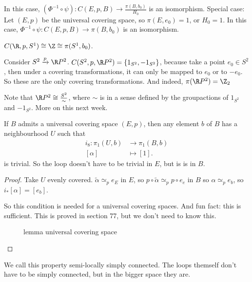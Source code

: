 In this case, $(\Phi^{-1}  \circ  \psi): C(E, p, B) \to  \frac{\pi(B,b_0) }{H_0}$ is an isomorphism.
Special case: Let $(E, p)$ be the universal covering space, so $\pi(E,e_0)  = 1$, or $H_0 = 1$.
In this case, $\Phi^{-1}  \circ  \psi: C(E, p, B) \to  \pi(B,b_0) $ is an isomorphism.

\begin{eg}
    $C(\R, p, S^1) \cong \Z \cong \pi(S^{1}, b_0)$.
\end{eg}
\begin{eg}
    Consider $S^2 \xrightarrow{p} \R P^2$.
    $C(S^2, p, \R P^2) = \{1_{S^2}, -1_{S^2}\}$,
    because take a point $e_0 \in S^2$, then under a covering transformations, it can only be mapped to $e_0$ or to $-e_0$.
    So these are the only covering transformations.
    And indeed, $\pi(\R P^2) = \Z_2$

    Note that $\R P^2 \cong \frac{S^2}{\sim}$, where $\sim $ is in a sense defined by the groupactions of $1_{S^2}$ and $-1_{S^2}$. More on this next week.
\end{eg}

\begin{lemma}[75.4]
    If $B$ admits a universal covering space $(E, p)$, then any element $b$ of $B$ has a neighbourhood $U$ such that
    \begin{align*}
        i_8: \pi_1(U, b) &\longrightarrow \pi_1(B, b) \\
        [\alpha] &\longmapsto [1]
    .\end{align*}
    is trivial. So the loop doesn't have to be trivial in $E$, but is is in $B$.
\end{lemma}
\begin{proof}

    Take $U$ evenly covered.
    $\tilde{\alpha} \simeq_p e_E$ in $E$, so  $p  \circ  \tilde{\alpha} \simeq_p  p  \circ  e_e$ in $B$ so $\alpha \simeq_p e_b$, so $i_*[\alpha] = [e_b]$.

    So this condition is needed for a universal covering spaces.
    And fun fact: this is sufficient.
    This is proved in section 77, but we don't need to know this.
\begin{figure}[H]
    \centering
    \caption{lemma universal covering space}
    \label{fig:lemma-universal-covering-space}
\end{figure}
\end{proof}

We call this property semi-locally simply connected.
The loops themself don't have to be simply connected, but in the bigger space they are.



